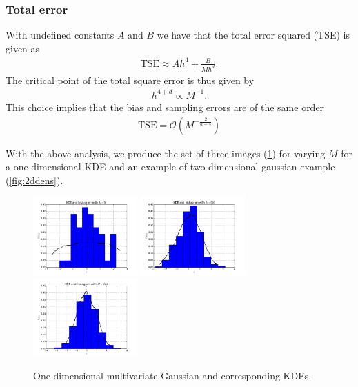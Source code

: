 \documentclass[a4paper,11pt]{article}
\newcommand{\parent}[1]{\left( {#1} \right)}
\newcommand{\bigo}[1]{\mathcal O \parent{{#1}}}
\begin{document}
\subsubsection*{Total error}
With undefined constants $A$ and $B$ we have that the 
total error squared (TSE) is given as
\begin{align}
\mathrm{TSE} \approx A h^4 + \frac{B}{Mh^d}.
\end{align}
The critical point of the total square error
is thus given by
\begin{align}
h^{4+d} \propto M^{-1}.
\end{align}
This choice implies that the bias and sampling errors are of the same order
\begin{align}
\mathrm{TSE} = \bigo{M^{-\frac{2}{d+4}}}
\end{align}

With the above analysis, we produce the set of three images (\ref{fig:1ddens})
for varying $M$ for a one-dimensional KDE and an example of
two-dimensional gaussian example (\ref{fig:2ddens}).

\begin{figure}
\begin{center}
\includegraphics[width=40mm]{./kde_histogram_M_50.pdf}
\includegraphics[width=40mm]{./kde_histogram_M_500.pdf}
\includegraphics[width=40mm]{./kde_histogram_M_5000.pdf}

\caption{
\label{fig:1ddens}
One-dimensional multivariate Gaussian and corresponding
KDEs.
}
\end{center}
\end{figure}
\end{document}
